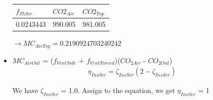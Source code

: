 \documentclass[a4paper]{article}
\numberwithin{equation}{section}
\begin{document}
\begin{itemize}
\begin{table}[H]
\centering
\begin{tabular}{|l|l|l|}
\hline
\rowcolor[HTML]{FFFC9E} 
\textbf{$f_{ThScr}$} & \textbf{$CO2_{Air}$} & \cellcolor[HTML]{FFFC9E}\textbf{$CO2_{Top}$} \\ \hline
0.0243443               & 990.005               & 981.005                                       \\ \hline
\end{tabular}
\end{table}
$\rightarrow MC_{AirTop} = 0.2190924703240242$
\item $MC_{AirOut}$ = ($f_{VentSide}$ + $f_{VentForced}$)($CO_{2 Air}$ - $CO_{2 Out}$)\\
\begin{align*}
  \eta_{InsScr} = \zeta_{InsScr} (2 -  \zeta_{InsScr})
\end{align*}

We have $\zeta_{InsScr}$ = 1.0. Assign to the equation, we get $\eta_{InsScr}$ = 1


\end{itemize}
\end{document}
